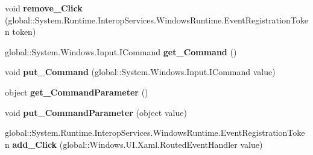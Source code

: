 \begin{DoxyCompactItemize}
\item 
\mbox{\label{interface_windows_1_1_u_i_1_1_xaml_1_1_controls_1_1_primitives_1_1_i_button_base_a96ebd008b8c4baa9c89c7671ec31b0a3}} 
void {\bfseries remove\+\_\+\+Click} (global\+::\+System.\+Runtime.\+Interop\+Services.\+Windows\+Runtime.\+Event\+Registration\+Token token)
\item 
\mbox{\label{interface_windows_1_1_u_i_1_1_xaml_1_1_controls_1_1_primitives_1_1_i_button_base_a32d7306ce7ae819ba8afcf8654502772}} 
global\+::\+System.\+Windows.\+Input.\+I\+Command {\bfseries get\+\_\+\+Command} ()
\item 
\mbox{\label{interface_windows_1_1_u_i_1_1_xaml_1_1_controls_1_1_primitives_1_1_i_button_base_a9a50f3b26afbef855e934ed8c1aa1c7a}} 
void {\bfseries put\+\_\+\+Command} (global\+::\+System.\+Windows.\+Input.\+I\+Command value)
\item 
\mbox{\label{interface_windows_1_1_u_i_1_1_xaml_1_1_controls_1_1_primitives_1_1_i_button_base_a844671cebaf433eca7be5733492d0c32}} 
object {\bfseries get\+\_\+\+Command\+Parameter} ()
\item 
\mbox{\label{interface_windows_1_1_u_i_1_1_xaml_1_1_controls_1_1_primitives_1_1_i_button_base_ae70dfa727c7375ca02faf4ed550e7941}} 
void {\bfseries put\+\_\+\+Command\+Parameter} (object value)
\item 
\mbox{\label{interface_windows_1_1_u_i_1_1_xaml_1_1_controls_1_1_primitives_1_1_i_button_base_a810a2e8203417bd2fe1eb15adc0d85b5}} 
global\+::\+System.\+Runtime.\+Interop\+Services.\+Windows\+Runtime.\+Event\+Registration\+Token {\bfseries add\+\_\+\+Click} (global\+::\+Windows.\+U\+I.\+Xaml.\+Routed\+Event\+Handler value)
\item 
\mbox{\label{interface_windows_1_1_u_i_1_1_xaml_1_1_controls_1_1_primitives_1_1_i_button_base_a96ebd008b8c4baa9c89c7671ec31b0a3}} 

\end{DoxyCompactItemize}
